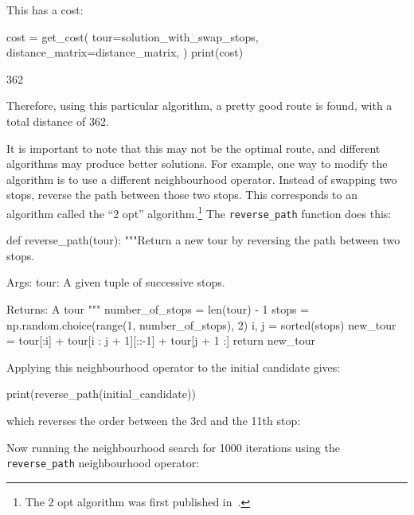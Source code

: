 \begin{pyout}
[0, 7, 2, 8, 5, 3, 1, 9, 12, 11, 4, 10, 6, 0]
\end{pyout}

This has a cost:

\begin{pyin}
cost = get_cost(
    tour=solution_with_swap_stops,
    distance_matrix=distance_matrix,
)
print(cost)
\end{pyin}

\begin{pyout}
362
\end{pyout}

Therefore, using this particular algorithm, a pretty good route is found, with a
total distance of 362.

It is important to note that this may not be the optimal route, and different algorithms
may produce better solutions.
For example, one way to modify the algorithm is to use a different
neighbourhood operator.
Instead of swapping two stops, reverse the path between those two
stops. This corresponds to an algorithm called the ``2 opt''
algorithm.\footnote{The 2 opt algorithm was first published in~\cite{croes1958method}.}
The \texttt{reverse_path} function does this:

\begin{pyin}
def reverse_path(tour):
    """Return a new tour by reversing the path between two stops.

    Args:
        tour: A given tuple of successive stops.

    Returns:
        A tour
    """
    number_of_stops = len(tour) - 1
    stops = np.random.choice(range(1, number_of_stops), 2)
    i, j = sorted(stops)
    new_tour = tour[:i] + tour[i : j + 1][::-1] + tour[j + 1 :]
    return new_tour
\end{pyin}

Applying this neighbourhood operator to the initial candidate gives:

\begin{pyin}
print(reverse_path(initial_candidate))
\end{pyin}

which reverses the order between the 3rd and the 11th stop:

\begin{pyout}
[0, 7, 4, 10, 8, 2, 9, 3, 11, 5, 12, 1, 6, 0]
\end{pyout}

Now running the neighbourhood search for 1000 iterations using the
\texttt{reverse_path} neighbourhood operator:

